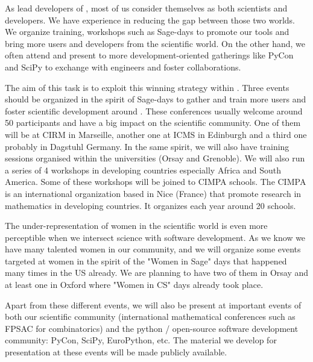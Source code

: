 \begin{workpackage}
\begin{tasklist}
\begin{task}[title=Dissemination: reaching towards users and fostering diversity, lead=PS,PM=12, partners={UB,USH,SA}, id=dissemination, wphases=0-48]

  As lead developers of \TheProject, most of us consider themselves as
  both scientists and developers. We have experience in reducing the
  gap between those two worlds. We organize training, workshops such
  as Sage-days to promote our tools and bring more users and
  developers from the scientific world. On the other hand, we often
  attend and present to more development-oriented gatherings like
  PyCon and SciPy to exchange with engineers and foster
  collaborations.

  The aim of this task is to exploit this winning strategy within
  \TheProject. Three events should be organized in the spirit of
  Sage-days to gather and train more users and foster scientific
  development around \TheProject. These conferences usually welcome
  around 50 participants and have a big impact on the scientific
  community. One of them will be at CIRM in Marseille, another one at
  ICMS in Edinburgh and a third one probably in Dagstuhl Germany. In
  the same spirit, we will also have training sessions organised
  within the universities (Orsay and Grenoble). We will also run a
  series of 4 workshops in developing countries especially Africa and
  South America. Some of these workshops will be joined to CIMPA
  schools.  The CIMPA is an international organization based in Nice
  (France) that promote research in mathematics in developing
  countries. It organizes each year around 20 schools.

  The under-representation of women in the scientific world is even
  more perceptible when we intersect science with software
  development. As we know we have many talented women in our
  community, and we will organize some events targeted at women in the
  spirit of the "Women in Sage" days that happened many times in the
  US already. We are planning to have two of them in Orsay and at least
  one in Oxford where "Women in CS" days already took place.

  Apart from these different events, we will also be present at
  important events of both our scientific community (international
  mathematical conferences such as FPSAC for combinatorics) and the
  python / open-source software development community: PyCon, SciPy,
  EuroPython, etc. The material we develop for presentation at these
  events will be made publicly available.
\end{task}



\end{tasklist}
\end{workpackage}
